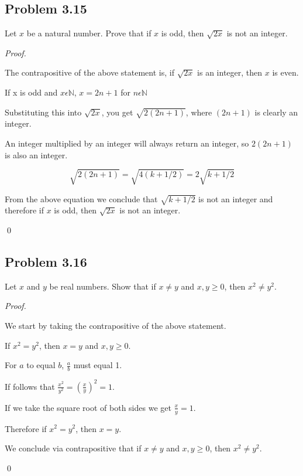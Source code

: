\documentclass{article}
\begin{document}
\subsection{Problem 3.15}
Let $x$ be a natural number. Prove that if $x$ is odd, then $\sqrt{2x}$ is not an integer.

\textit{Proof.}
\begin{addmargin}[0.75cm]{0cm}
	
	The contrapositive of the above statement is, if $\sqrt{2x}$ is an integer, then $x$ is even.
	
	If x is odd and $x \epsilon \mathbb{N}$, $x = 2n+1$ for $n \epsilon \mathbb{N}$
	
	Substituting this into $\sqrt{2x}$, you get $\sqrt{2(2n+1)}$, where $(2n+1)$ is clearly an integer.
	
	An integer multiplied by an integer will always return an integer, so $2(2n + 1)$ is also an integer.
	
	\begin{equation}
		\sqrt{2(2n+1)} = \sqrt{4(k+1/2)} = 2 \sqrt{k+1/2}
	\end{equation}
	
	From the above equation we conclude that $\sqrt{k+1/2}$ is not an integer and therefore 
	if $x$ is odd, then $\sqrt{2x}$ is not an integer.
	
	\qed
\end{addmargin}

\pagebreak
\subsection{Problem 3.16}
Let $x$ and $y$ be real numbers. Show that if $x \neq y$ and $x,y \geq 0$, then $x^2 \neq y^2$.

\textit{Proof.}
\begin{addmargin}[0.75cm]{0cm}
	We start by taking the contrapositive of the above statement.
	
	If $x^2 = y^2$, then $x = y$ and $x,y \geq 0$.
	
	For $a$ to equal $b$, $\frac{a}{b}$ must equal 1.
	
	If follows that $\frac{x^2}{y^2}=(\frac{x}{y})^2=1$.
	
	If we take the square root of both sides we get $\frac{x}{y}=1$.
	
	Therefore if $x^2=y^2$, then $x=y$.
	
	We conclude via contrapositive that if $x \neq y$ and $x,y \geq 0$, then $x^2 \neq y^2$.
	
	\qed
\end{addmargin}
\end{document}
